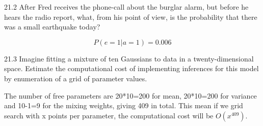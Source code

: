 \documentclass[12pt, a4paper]{article}
\begin{document}
\begin{prob}{21.2}
After Fred receives the phone-call about the burglar alarm, but before he hears the radio report, what, from his point of view, is the probability that there was a small earthquake today?
\end{prob}
\begin{sol}
$$P(e=1|a=1) = 0.006$$
\end{sol}
\bigskip

\begin{prob}{21.3}
Imagine fitting a mixture of ten Gaussians to data in a twenty-dimensional space. Estimate the computational cost of implementing inferences for this model by enumeration of a grid of parameter values.
\end{prob}
\begin{sol}
The number of free parameters are 20*10=200 for mean, 20*10=200 for variance and 10-1=9 for the mixing weights,
giving 409 in total. This mean if we grid search with x points per parameter, the computational cost will be $O(x^{409})$.
\end{sol}
\bigskip
\end{document}
